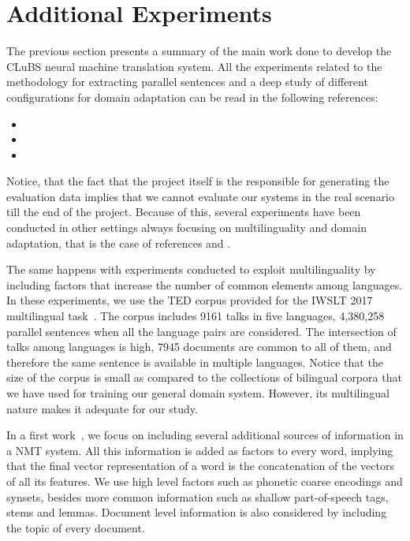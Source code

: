 \documentclass[a4paper,11pt]{article}
\begin{document}
\begin{table}
\begin{tabular}{l rrr rrr}
\bottomrule
\end{tabular}
\end{table}

 
\section{Additional Experiments}
\label{s:moreExperiments}

The previous section presents a summary of the main work done to develop the CLuBS neural machine translation system. All the experiments related to the methodology for extracting parallel sentences and a deep study of different configurations for domain adaptation can be read in the following references:
\begin{itemize}
 \item[\cite{EspanaBarron:2017}] 
 \item[\cite{espanaEtAl:2017}] 
 \item[\cite{tesisAdam}] 
\end{itemize}


Notice, that the fact that the project itself is the responsible for generating the evaluation data implies that we cannot evaluate our systems in the real scenario till the end of the project. Because of this, several experiments have been conducted in other settings always focusing on multilinguality and domain adaptation, that is the case of references \cite{EspanaBarron:2017} and \cite{espanaEtAl:2017}.  

The same happens with experiments conducted to exploit multilinguality by including factors that increase the number of common elements among languages. In these experiments, we use the TED corpus provided for the IWSLT 2017 multilingual task~\cite{iwslt-overview:2017}. The corpus includes 9161 talks in five languages, 4,380,258 parallel sentences when all the language pairs are considered. The intersection of talks among languages is high, 7945 documents are common to all of them, and therefore the same sentence is available in multiple languages.  Notice that the size of the corpus is small as compared to the collections of bilingual corpora that we have used for training our general domain system. However, its multilingual nature makes it adequate for our study.

In a first work~\cite{espanaVanGenabith:IWSLT:2017}, we focus on including several additional sources of information in a NMT system. All this information is added as factors to every word, implying that the final vector representation of a word is the concatenation of the vectors of all its features. We use high level factors such as phonetic coarse encodings and synsets, besides more common information such as shallow part-of-speech tags, stems and lemmas. Document level information is also considered by including the topic of every document. 
\end{document}

